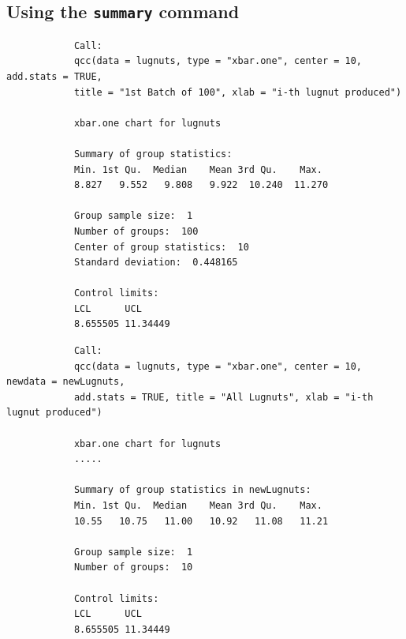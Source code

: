 \documentclass[]{report}
\begin{document}
		\subsection{Using the \texttt{summary} command}
		\begin{framed}
			\begin{verbatim}
			Call:
			qcc(data = lugnuts, type = "xbar.one", center = 10, add.stats = TRUE,     
			title = "1st Batch of 100", xlab = "i-th lugnut produced")
			
			xbar.one chart for lugnuts 
			
			Summary of group statistics:
			Min. 1st Qu.  Median    Mean 3rd Qu.    Max. 
			8.827   9.552   9.808   9.922  10.240  11.270 
			
			Group sample size:  1
			Number of groups:  100
			Center of group statistics:  10
			Standard deviation:  0.448165 
			
			Control limits:
			LCL      UCL
			8.655505 11.34449
			\end{verbatim}
		\end{framed}
		\begin{framed}
			\begin{verbatim}
			Call:
			qcc(data = lugnuts, type = "xbar.one", center = 10, newdata = newLugnuts,     
			add.stats = TRUE, title = "All Lugnuts", xlab = "i-th lugnut produced")
			
			xbar.one chart for lugnuts 
			.....
			
			Summary of group statistics in newLugnuts:
			Min. 1st Qu.  Median    Mean 3rd Qu.    Max. 
			10.55   10.75   11.00   10.92   11.08   11.21 
			
			Group sample size:  1
			Number of groups:  10 
			
			Control limits:
			LCL      UCL
			8.655505 11.34449
			
			\end{verbatim}
		\end{framed}
		\newpage
		
\end{document}

